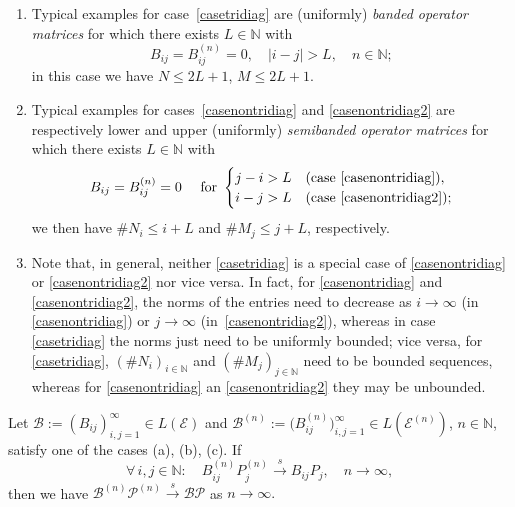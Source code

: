 \documentclass[a4paper,reqno]{amsart}
\begin{document}
\begin{rem}
\begin{enumerate}[label=\rm{\roman{*})}]
\item Typical examples for case~\ref{casetridiag} are (uniformly) \emph{banded operator matrices} 
for which there exists $L\in{\mathbb{N}}$ with $$B_{ij}=B_{ij}^{(n)}=0, \quad |i-j|>L, \quad n\in{\mathbb{N}};$$ 
in this case we have $N\leq 2L+1$, $M\leq 2L+1$.

\item Typical examples for cases~\ref{casenontridiag} and \ref{casenontridiag2} are respectively lower and upper (uniformly) \emph{semibanded operator matrices}
for which there exists $L\in{\mathbb{N}}$ with 
$$B_{ij}=B_{ij}^{(n)}=0 \quad\text{ for } \begin{cases}j-i>L &\text{(case \ref{casenontridiag})},\\ i-j>L &\text{(case \ref{casenontridiag2})};\end{cases}$$
 we then have $\# N_i\leq i+L$ and $\# M_j\leq j+L$, respectively.

\item Note that, in general, neither \ref{casetridiag} is a special case of  \ref{casenontridiag} or \ref{casenontridiag2} nor vice versa.
In fact, for \ref{casenontridiag} and \ref{casenontridiag2},
 the norms of the entries need to decrease as $i\to\infty$ (in \ref{casenontridiag}) or $j\to\infty$ (in~\ref{casenontridiag2}), 
whereas in case \ref{casetridiag} the norms just need to be uniformly bounded;
vice versa, for \ref{casetridiag}, $(\# N_i)_{i\in{\mathbb{N}}}$ and $(\# M_j)_{j\in{\mathbb{N}}}$ need to be bounded sequences, whereas for \ref{casenontridiag} an \ref{casenontridiag2} they may be unbounded.
\end{enumerate}
\end{rem}

\begin{prop} \label{thmconvbddl2matrix}
Let ${\mathcal B}:=(B_{ij})_{i,j=1}^{\infty}\in L({\mathcal E})$ and ${\mathcal B}^{(n)}:=\big(B_{ij}^{(n)}\big)_{i,j=1}^{\infty}\in L({\mathcal E}^{(n)})$, $n\in{\mathbb{N}}$, satisfy one of the cases {\rm (a), (b), (c)}.
If 
\begin{equation} \forall\,i,j\in{\mathbb{N}}:\quad B_{ij}^{(n)}P_j^{(n)}{\stackrel{s}{\longrightarrow}} B_{ij}P_j, \quad n\to\infty, \label{eqconvforiandl}\end{equation}
then we have 
${\mathcal B}^{(n)}{\mathcal P}^{(n)}{\stackrel{s}{\longrightarrow}}{\mathcal B}{\mathcal P}$ as $n\to\infty.$
\end{prop}
\end{document}

